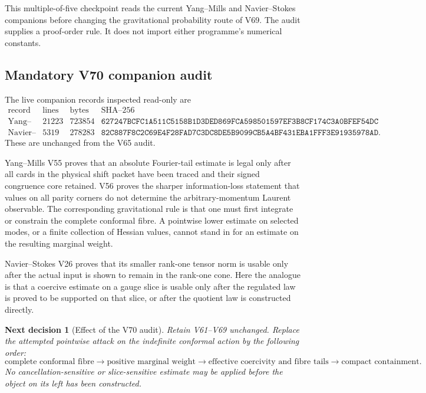 \documentclass[11pt]{article}
\newtheorem{decision}[theorem]{Next decision}
\theoremstyle{remark}
\begin{document}
This multiple-of-five checkpoint reads the current Yang--Mills and
Navier--Stokes companions before changing the gravitational
probability route of V69.  The audit supplies a proof-order rule.
It does not import either programme's numerical constants.

\subsection{Mandatory V70 companion audit}

The live companion records inspected read-only are
\[
\begin{array}{c|r|r|c}
\text{record}&\text{lines}&\text{bytes}&\text{SHA--256}\\ \hline
\text{Yang--Mills V56}&21223&723854&
\texttt{627247BCFC1A511C5158B1D3DED869FCA598501597EF3B8CF174C3A0BFEF54DC}\\
\text{Navier--Stokes V26}&5319&278283&
\texttt{82C887F8C2C69E4F28FAD7C3DC8DE5B9099CB5A4BF431EBA1FFF3E91935978AD}.
\end{array}                                                   \tag{70.1}
\]
These are unchanged from the V65 audit.

Yang--Mills V55 proves that an absolute Fourier-tail estimate is
legal only after all cards in the physical shift packet have been
traced and their signed congruence core retained.  V56 proves the
sharper information-loss statement that values on all parity corners
do not determine the arbitrary-momentum Laurent observable.  The
corresponding gravitational rule is that one must first integrate or
constrain the complete conformal fibre.  A pointwise lower estimate
on selected modes, or a finite collection of Hessian values, cannot
stand in for an estimate on the resulting marginal weight.

Navier--Stokes V26 proves that its smaller rank-one tensor norm is
usable only after the actual input is shown to remain in the
rank-one cone.  Here the analogue is that a coercive estimate on a
gauge slice is usable only after the regulated law is proved to be
supported on that slice, or after the quotient law is constructed
directly.

\begin{decision}[Effect of the V70 audit]
\label{dec:v12v70-audit}
Retain V61--V69 unchanged.  Replace the attempted pointwise attack on
the indefinite conformal action by the following order:
\[
 \boxed{
 \text{complete conformal fibre}
 \longrightarrow
 \text{positive marginal weight}
 \longrightarrow
 \text{effective coercivity and fibre tails}
 \longrightarrow
 \text{compact containment}.}                              \tag{70.2}
\]
No cancellation-sensitive or slice-sensitive estimate may be applied
before the object on its left has been constructed.
\end{decision}
\end{document}
